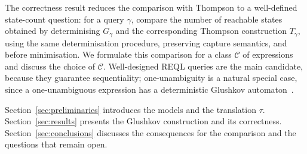 The correctness result reduces the comparison with Thompson to a
well-defined state-count question: for a query $\gamma$, compare the
number of reachable states obtained by determinising $G_\gamma$ and the
corresponding Thompson construction $T_\gamma$, using the same
determinisation procedure, preserving capture semantics, and before
minimisation. We formulate this comparison for a class $\mathcal C$ of
expressions and discuss the choice of $\mathcal C$. Well-designed REQL
queries are the main candidate, because they guarantee sequentiality;
one-unambiguity is a natural special case, since a one-unambiguous
expression has a deterministic Glushkov
automaton~\cite{BruggemannKleinW98}.

Section~\ref{sec:preliminaries} introduces the models and the
translation $\tau$. Section~\ref{sec:results} presents the Glushkov
construction and its correctness. Section~\ref{sec:conclusions}
discusses the consequences for the comparison and the questions that
remain open.
